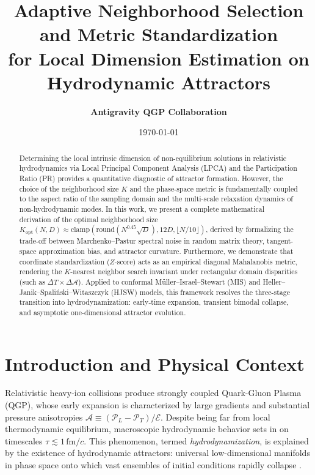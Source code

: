 \documentclass[11pt,a4paper]{article}
\title{\textbf{Adaptive Neighborhood Selection and Metric Standardization\\for Local Dimension Estimation on Hydrodynamic Attractors}}
\author{\textbf{Antigravity QGP Collaboration}}
\date{\today}
\begin{document}
\maketitle

\begin{abstract}
Determining the local intrinsic dimension of non-equilibrium solutions in relativistic hydrodynamics via Local Principal Component Analysis (LPCA) and the Participation Ratio (PR) provides a quantitative diagnostic of attractor formation. However, the choice of the neighborhood size $K$ and the phase-space metric is fundamentally coupled to the aspect ratio of the sampling domain and the multi-scale relaxation dynamics of non-hydrodynamic modes. In this work, we present a complete mathematical derivation of the optimal neighborhood size $K_{\mathrm{opt}}(N, D) \approx \mathrm{clamp}(\mathrm{round}(N^{0.45}\sqrt{D}), 12D, \lfloor N/10 \rfloor)$, derived by formalizing the trade-off between Marchenko--Pastur spectral noise in random matrix theory, tangent-space approximation bias, and attractor curvature. Furthermore, we demonstrate that coordinate standardization ($Z$-score) acts as an empirical diagonal Mahalanobis metric, rendering the $K$-nearest neighbor search invariant under rectangular domain disparities (such as $\Delta T \times \Delta \mathcal{A}$). Applied to conformal Müller--Israel--Stewart (MIS) and Heller--Janik--Spaliński--Witaszczyk (HJSW) models, this framework resolves the three-stage transition into hydrodynamization: early-time expansion, transient bimodal collapse, and asymptotic one-dimensional attractor evolution.
\end{abstract}

\vspace{0.5em}
\tableofcontents
\newpage

\section{Introduction and Physical Context}
\label{sec:introduction}
Relativistic heavy-ion collisions produce strongly coupled Quark-Gluon Plasma (QGP), whose early expansion is characterized by large gradients and substantial pressure anisotropies $\mathcal{A} \equiv (\mathcal{P}_L - \mathcal{P}_T)/\mathcal{E}$. Despite being far from local thermodynamic equilibrium, macroscopic hydrodynamic behavior sets in on timescales $\tau \lesssim 1\,\mathrm{fm}/c$. This phenomenon, termed \emph{hydrodynamization}, is explained by the existence of hydrodynamic attractors: universal low-dimensional manifolds in phase space onto which vast ensembles of initial conditions rapidly collapse \cite{Heller2015,Romatschke2017,Spalinski2016,Heller2014}.
\end{document}
